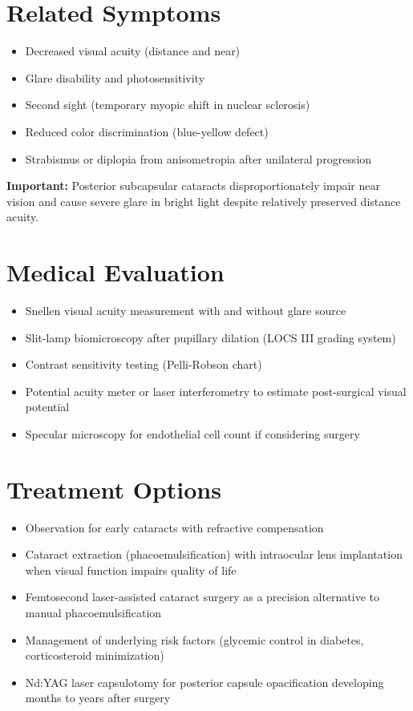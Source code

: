 \section*{Related Symptoms}
\begin{itemize}
 \item Decreased visual acuity (distance and near)
 \item Glare disability and photosensitivity
 \item Second sight (temporary myopic shift in nuclear sclerosis)
 \item Reduced color discrimination (blue-yellow defect)
 \item Strabismus or diplopia from anisometropia after unilateral progression
\end{itemize}
\textbf{Important:} Posterior subcapsular cataracts disproportionately impair near vision and cause severe glare in bright light despite relatively preserved distance acuity.

\section*{Medical Evaluation}
\begin{itemize}
 \item Snellen visual acuity measurement with and without glare source
 \item Slit-lamp biomicroscopy after pupillary dilation (LOCS III grading system)
 \item Contrast sensitivity testing (Pelli-Robson chart)
 \item Potential acuity meter or laser interferometry to estimate post-surgical visual potential
 \item Specular microscopy for endothelial cell count if considering surgery
\end{itemize}

\section*{Treatment Options}
\begin{itemize}
 \item Observation for early cataracts with refractive compensation
 \item Cataract extraction (phacoemulsification) with intraocular lens implantation when visual function impairs quality of life
 \item Femtosecond laser-assisted cataract surgery as a precision alternative to manual phacoemulsification
 \item Management of underlying risk factors (glycemic control in diabetes, corticosteroid minimization)
 \item Nd:YAG laser capsulotomy for posterior capsule opacification developing months to years after surgery
\end{itemize}

